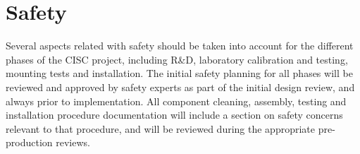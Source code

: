 \section{Safety}
\label{sec:fdgen-slow-cryo-safety}


Several aspects related with safety should be taken into account for the different phases of the CISC project, including R\&D, laboratory calibration and testing, mounting tests and installation. 
The initial safety planning for all phases will be reviewed and approved by safety experts as part of the initial design review, and always prior to implementation. 
All component cleaning, assembly, testing  and installation procedure documentation will include a section on safety concerns
relevant to that procedure, and will be reviewed during the appropriate pre-production reviews.

